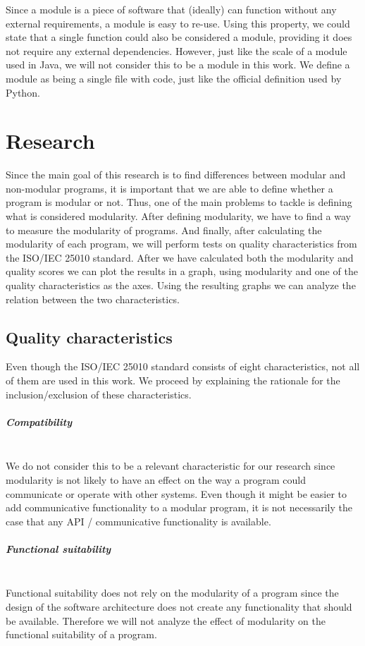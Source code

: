 \documentclass[twoside]{uva-inf-bachelor-thesis}
\newcommand{\myparagraph}[1]{\paragraph{#1}\mbox{}\\}
\begin{document}
Since a module is a piece of software that (ideally) can function without any external requirements, a module is easy to re-use. Using this property, we could state that a single function could also be considered a module, providing it does not require any external dependencies. However, just like the scale of a module used in Java\cite{javamodules}, we will not consider this to be a module in this work. We define a module as being a single file with code, just like the official definition used by Python\cite{pythonmodules}.

\chapter{Research}
Since the main goal of this research is to find differences between modular and non-modular programs, it is important that we are able to define whether a program is modular or not. Thus, one of the main problems to tackle is defining what is considered modularity. After defining modularity, we have to find a way to measure the modularity of programs. And finally, after calculating the modularity of each program, we will perform tests on quality characteristics from the ISO/IEC 25010 standard\cite{ISO25010}. After we have calculated both the modularity and quality scores we can plot the results in a graph, using modularity and one of the quality characteristics as the axes. Using the resulting graphs we can analyze the relation between the two characteristics.\\

\section{Quality characteristics}
Even though the ISO/IEC 25010 standard consists of eight characteristics, not all of them are used in this work. We proceed by explaining the rationale for the inclusion/exclusion of these characteristics.

\myparagraph{Compatibility}
We do not consider this to be a relevant characteristic for our research since modularity is not likely to have an effect on the way a program could communicate or operate with other systems. Even though it might be easier to add communicative functionality to a modular program, it is not necessarily the case that any API / communicative functionality is available.

\myparagraph{Functional suitability}
Functional suitability does not rely on the modularity of a program since the design of the software architecture does not create any functionality that should be available. Therefore we will not analyze the effect of modularity on the functional suitability of a program.
\end{document}
